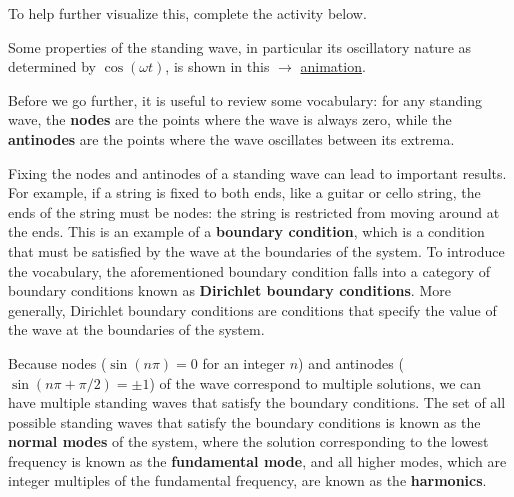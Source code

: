 \documentclass{article}
\begin{document}
To help further visualize this, complete the activity below.

\begin{tcolorbox}[arc=2mm, colback=red!10!white, colframe=red!50!black, title=\textbf{ACTIVITY}]
	Some properties of the standing wave, in particular its oscillatory nature as determined by $\cos(\omega t)$, is shown in this $\rightarrow$ \textcolor{red}{\href{https://youtu.be/L-QUKxQPHf8}{animation}}.
\end{tcolorbox}

\vspace{1em}

Before we go further, it is useful to review some vocabulary: for any standing wave, the \textbf{nodes} are the points where the wave is always zero, while the \textbf{antinodes} are the points where the wave oscillates between its extrema.

\vspace{1em}

Fixing the nodes and antinodes of a standing wave can lead to important results. For example, if a string is fixed to both ends, like a guitar or cello string, the ends of the string must be nodes: the string is restricted from moving around at the ends. This is an example of a \textbf{boundary condition}, which is a condition that must be satisfied by the wave at the boundaries of the system. To introduce the vocabulary, the aforementioned boundary condition falls into a category of boundary conditions known as \textbf{Dirichlet boundary conditions}. More generally, Dirichlet boundary conditions are conditions that specify the value of the wave at the boundaries of the system.

\vspace{1em}


Because nodes ($\sin (n\pi) = 0$ for an integer $n$) and antinodes ($\sin(n\pi + \pi / 2) = \pm 1$) of the wave correspond to multiple solutions, we can have multiple standing waves that satisfy the boundary conditions. The set of all possible standing waves that satisfy the boundary conditions is known as the \textbf{normal modes} of the system, where the solution corresponding to the lowest frequency is known as the \textbf{fundamental mode}, and all higher modes, which are integer multiples of the fundamental frequency, are known as the \textbf{harmonics}.
\end{document}
